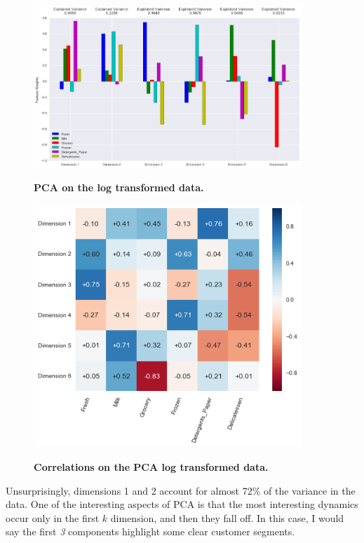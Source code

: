 \documentclass[twoside,openright,titlepage,numbers=noenddot,headinclude,%
               footinclude=true,cleardoublepage=empty,abstractoff,BCOR=5mm,%
               paper=a4,fontsize=11pt,ngerman,american]{scrreprt}
\numberwithin{theorem}{chapter}
\numberwithin{definition}{chapter}
\numberwithin{algorithm}{chapter}
\numberwithin{figure}{chapter}
\numberwithin{table}{chapter}
\numberwithin{equation}{chapter}
\begin{document}
\begin{figure}[!hbtp]
\centering
    
    \includegraphics[width=0.9\textwidth]{figures/pca}
    \label{pca}
    
    \caption{\textbf{PCA on the log transformed data. }}
\end{figure}

\begin{figure}[!hbtp]
\centering
    
    \includegraphics[width=0.9\textwidth]{figures/pcaCorrelation}
    \label{pcaCorrelation}
    
    \caption{\textbf{Correlations on the PCA log transformed data. }}
\end{figure}


Unsurprisingly, dimensions 1 and 2 account for almost 72\% of the variance in the data. One of the interesting aspects of PCA is that the most interesting dynamics occur only in the first $k$ dimension, and then they fall off. In this case, I would say the first \emph{3} components highlight some clear customer segments.    
\end{document}
